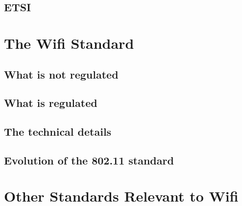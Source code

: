 \subsection{ETSI}

\section{The Wifi Standard}

\subsection{What is not regulated}

\subsection{What is regulated}

\subsection{The technical details}

\subsection{Evolution of the 802.11 standard}

\section{Other Standards Relevant to Wifi}

